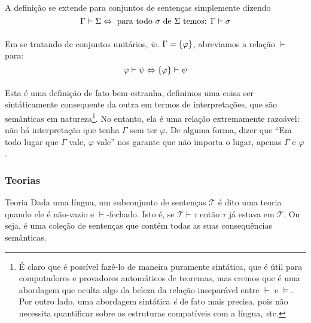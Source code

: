         \paragraph{}
            A definição se extende para conjuntos de sentenças simplemente dizendo
            $$\Gamma\vdash\Sigma\Leftrightarrow\text{ para todo $\sigma$ de $\Sigma$ temos: } \Gamma\vdash\sigma$$
        \paragraph{}
            Em se tratando de conjuntos unitários, {\emph ie.} $\Gamma=\SET{\varphi}$, abreviamos a relação $\vdash$ para:
            $$\varphi\vdash\psi\BIM\SET{\varphi}\vdash\psi$$
        \paragraph{}
            Esta é uma definição de fato bem estranha, definimos uma coisa ser sintáticamente 
            consequente da outra em termos de interpretações, que são semânticas em 
            natureza\footnote{
                É claro que é possível fazê-lo de maneira puramente sintática, que é útil 
                para computadores e provadores automáticos de teoremas, mas cremos que é 
                uma abordagem que oculta algo da beleza da relação inseparável entre $\vdash$ 
                e $\vDash$.\\
                Por outro lado, uma abordagem sintática {\emph é} de fato mais precisa, pois não
                necessita quantificar sobre as estruturas compatíveis com a língua, 
                {\emph etc.}
            }. No entanto,
            ela é uma relação extremamente razoável: não há interpretação que tenha $\Gamma$ 
            sem ter $\varphi$. De alguma forma, dizer que ``Em todo lugar que $\Gamma$ vale, 
            $\varphi$ vale'' nos garante que não importa o lugar, apenas $\Gamma$ e $\varphi$.
        
        \subsubsection{Teorias}
        \begin{definition}{Teoria}
                Dada uma língua, um subconjunto de sentenças $\mathcal{T}$ é dito uma teoria
                quando ele é não-vazio e $\vdash$-fechado. Isto é, se $\mathcal{T}\vdash\tau$ 
                então $\tau$ já estava em $\mathcal{T}$. Ou seja, é uma coleção de sentenças 
                que contém todas as suas consequências semânticas.
        \end{definition}
